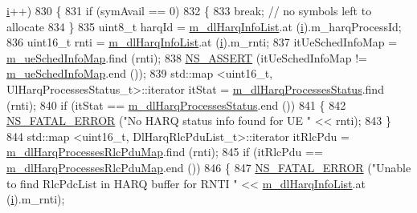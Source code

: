 \begin{DoxyCode}
      \hyperlink{bernuolliDistribution_8m_a6f6ccfcf58b31cb6412107d9d5281426}{i}++)
830                 \{
831                         \textcolor{keywordflow}{if} (symAvail == 0)
832                         \{
833                                 \textcolor{keywordflow}{break};  \textcolor{comment}{// no symbols left to allocate}
834                         \}
835                         uint8\_t harqId = \hyperlink{classns3_1_1MmWaveFlexTtiMaxRateMacScheduler_a06e986195cd0656360fe3b94ac65d6ad}{m\_dlHarqInfoList}.at (\hyperlink{bernuolliDistribution_8m_a6f6ccfcf58b31cb6412107d9d5281426}{i}).m\_harqProcessId;
836                         uint16\_t rnti = \hyperlink{classns3_1_1MmWaveFlexTtiMaxRateMacScheduler_a06e986195cd0656360fe3b94ac65d6ad}{m\_dlHarqInfoList}.at (\hyperlink{bernuolliDistribution_8m_a6f6ccfcf58b31cb6412107d9d5281426}{i}).m\_rnti;
837                         itUeSchedInfoMap = \hyperlink{classns3_1_1MmWaveFlexTtiMaxRateMacScheduler_ac8359b3799f29f5b49e0f2dd52acd0ab}{m\_ueSchedInfoMap}.find (rnti);
838                         \hyperlink{assert_8h_a6dccdb0de9b252f60088ce281c49d052}{NS\_ASSERT} (itUeSchedInfoMap != \hyperlink{classns3_1_1MmWaveFlexTtiMaxRateMacScheduler_ac8359b3799f29f5b49e0f2dd52acd0ab}{m\_ueSchedInfoMap}.end ());
839                         std::map <uint16\_t, UlHarqProcessesStatus\_t>::iterator itStat = 
      \hyperlink{classns3_1_1MmWaveFlexTtiMaxRateMacScheduler_a3f74b4d493895851f7ee62f90584fe0c}{m\_dlHarqProcessesStatus}.find (rnti);
840                         \textcolor{keywordflow}{if} (itStat == \hyperlink{classns3_1_1MmWaveFlexTtiMaxRateMacScheduler_a3f74b4d493895851f7ee62f90584fe0c}{m\_dlHarqProcessesStatus}.end ())
841                         \{
842                                 \hyperlink{group__fatal_ga5131d5e3f75d7d4cbfd706ac456fdc85}{NS\_FATAL\_ERROR} (\textcolor{stringliteral}{"No HARQ status info found for UE "} << rnti);
843                         \}
844                         std::map <uint16\_t, DlHarqRlcPduList\_t>::iterator itRlcPdu =  
      \hyperlink{classns3_1_1MmWaveFlexTtiMaxRateMacScheduler_a5eeb7aeecc26d9849aadd3da24e00f68}{m\_dlHarqProcessesRlcPduMap}.find (rnti);
845                         \textcolor{keywordflow}{if} (itRlcPdu == \hyperlink{classns3_1_1MmWaveFlexTtiMaxRateMacScheduler_a5eeb7aeecc26d9849aadd3da24e00f68}{m\_dlHarqProcessesRlcPduMap}.end ())
846                         \{
847                                 \hyperlink{group__fatal_ga5131d5e3f75d7d4cbfd706ac456fdc85}{NS\_FATAL\_ERROR} (\textcolor{stringliteral}{"Unable to find RlcPdcList in HARQ buffer for
       RNTI "} << \hyperlink{classns3_1_1MmWaveFlexTtiMaxRateMacScheduler_a06e986195cd0656360fe3b94ac65d6ad}{m\_dlHarqInfoList}.at (\hyperlink{bernuolliDistribution_8m_a6f6ccfcf58b31cb6412107d9d5281426}{i}).m\_rnti);

\end{DoxyCode}
